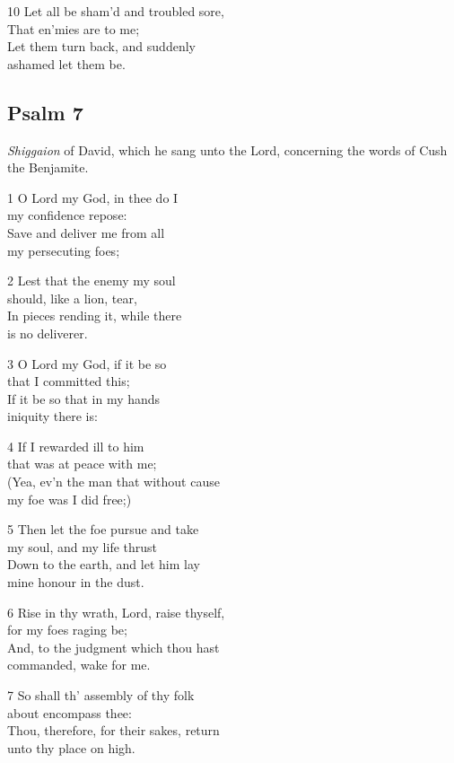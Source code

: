 \begin{multicols}{3}
10 Let all be sham’d and troubled sore,\\
That en’mies are to me;\\
Let them turn back, and suddenly\\
ashamed let them be.

\begin{center}
\quad{}\quad{}
\end{center}


\subsection*{Psalm 7}


\emph{Shiggaion} of David, which he sang unto the Lord,
concerning the words of Cush the Benjamite.

1 O Lord my God, in thee do I\\
my confidence repose:\\
Save and deliver me from all\\
my persecuting foes;

2 Lest that the enemy my soul\\
should, like a lion, tear,\\
In pieces rending it, while there\\
is no deliverer.

3 O Lord my God, if it be so\\
that I committed this;\\
If it be so that in my hands\\
iniquity there is:

4 If I rewarded ill to him\\
that was at peace with me;\\
(Yea, ev’n the man that without cause\\
my foe was I did free;)

5 Then let the foe pursue and take\\
my soul, and my life thrust\\
Down to the earth, and let him lay\\
mine honour in the dust.

6 Rise in thy wrath, Lord, raise thyself,\\
for my foes raging be;\\
And, to the judgment which thou hast\\
commanded, wake for me.

7 So shall th’ assembly of thy folk\\
about encompass thee:\\
Thou, therefore, for their sakes, return\\
unto thy place on high.


\end{multicols}
